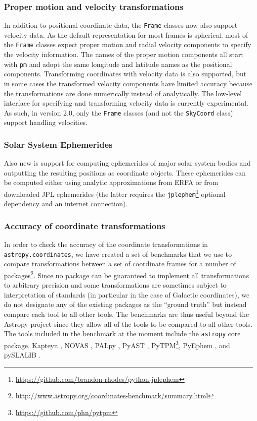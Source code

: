 \documentclass[modern]{aastex61}
\newcommand{\package}[1]{\texttt{#1}\xspace}
\newcommand{\astropy}{Astropy\xspace}
\newcommand{\astropypkg}{\package{astropy}}
\begin{document}
\subsubsection{Proper motion and velocity transformations}
    In addition to positional coordinate data, the \texttt{Frame} classes now
    also support velocity data.
    As the default representation for most frames is spherical, most of the
    \texttt{Frame} classes expect proper motion and radial velocity components
    to specify the velocity information.
    The names of the proper motion components all start with \texttt{pm} and
    adopt the same longitude and latitude names as the positional components.
    Transforming coordinates with velocity data is also supported, but in some
    cases the transformed velocity components have limited accuracy because the
    transformations are done numerically instead of analytically.
    The low-level interface for specifying and transforming velocity data  is
    currently experimental.  As such, in version 2.0, only the \texttt{Frame}
    classes (and not the \texttt{SkyCoord} class) support handling velocities.

\subsubsection{Solar System Ephemerides}
    Also new is support for computing ephemerides of major solar system bodies
    and outputting the resulting positions as coordinate objects.
    These ephemerides can be computed either using analytic approximations from
    ERFA or from downloaded JPL ephemerides (the latter requires the
    \package{jplephem}\footnote{\url{https://github.com/brandon-rhodes/python-jplephem}}
    optional dependency and an internet connection).

\subsubsection{Accuracy of coordinate transformations}

In order to check the accuracy of the coordinate transformations in
\package{astropy.coordinates}, we have created a set of benchmarks that we use
to compare transformations between a set of coordinate frames for a number of
packages\footnote{\url{http://www.astropy.org/coordinates-benchmark/summary.html}}.
Since no package can be guaranteed to implement all transformations to
arbitrary precision and some transformations are sometimes subject to
interpretation of standards (in particular in the case of Galactic coordinates),
we do not designate any of the existing packages as the ``ground truth'' but
instead compare each tool to all other tools. The benchmarks are thus useful
beyond the \astropy project since they allow all of the tools to be compared to
all other tools. The tools included in the benchmark at the moment include the
\astropypkg core package, Kapteyn \citep{kapteyn}, NOVAS \citep{novas},
PALpy \citep{pal}, PyAST \citep[a wrapper for AST, described in][]{ast},
PyTPM\footnote{\url{https://github.com/phn/pytpm}}, PyEphem \citep{pyephem},
and pySLALIB \citep[a Python wrapper for SLALIB, described in][]{slalib}.
\end{document}
